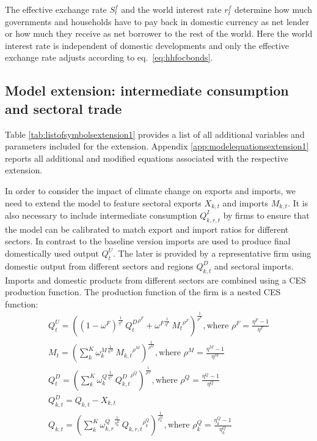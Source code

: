 \documentclass[10pt,a4paper]{article}
\begin{document}
The effective exchange rate $S^f_{t}$ and the world interest rate $r^{f}_{t}$ determine how much governments and households have to pay back in domestic currency as net lender or how much they receive as net borrower to the rest of the world. Here the world interest rate is independent of domestic developments and only the effective exchange rate adjusts according to eq.~\ref{eq:hhfocbonds}.

\subsection{Model extension: intermediate consumption and sectoral trade} 
Table \ref{tab:listofsymbolsextension1} provides a list of all additional variables and parameters included for the extension. Appendix \ref{app:modelequationsextension1} reports all additional and modified equations associated with the respective extension.

In order to consider the impact of climate change on exports and imports, we need to extend the model to feature sectoral exports $X_{k,t}$ and imports $M_{k,t}$. It is also necessary to include intermediate consumption $Q^{I}_{k,r,t}$ by firms to ensure that the model can be calibrated to match export and import ratios for different sectors. In contrast to the baseline version imports are used to produce final domestically used output $Q^U_t$. The later is provided by a representative firm using domestic output from different sectors and regions $Q^{D}_{k,t}$ and sectoral imports. Imports and domestic products from different sectors are combined using a CES production function. The production function of the firm is a nested CES function:
\begin{align}
Q^U_t = \left((1 - \omega^{F})^{\frac{1}{\eta^{F}}} \, {Q^D_t}^{\rho^F} + {\omega^{F}}^{\frac{1}{\eta^{F}}} \, {M_t}^{\rho^F}\right)^{\frac{1}{\rho^F}}, \mbox{where } \rho^{F} = \frac{\eta^F - 1}{\eta^F} \label{eq:cesfinal}\\
M_t = \left(\sum_{k}^{K}{\omega^{M}_{k}}^{\frac{1}{\eta^{M}}} \, {M_{k,t}}^{\rho^M}\right)^{\frac{1}{\rho^M}}, \mbox{where } \rho^{M} = \frac{\eta^M - 1}{\eta^M} \label{eq:imports} \\
Q^D_t = \left(\sum_{k}^{K}{\omega^{Q}_{k}}^{\frac{1}{\eta^{Q}}} \, {Q^D_{k,t}}^{\rho^Q}\right)^{\frac{1}{\rho^Q}}, \mbox{where } \rho^{Q} = \frac{\eta^Q - 1}{\eta^Q} \label{eq:domesticusedoutput} \\
Q^{D}_{k,t} = Q_{k,t} - X_{k,t} \nonumber \\ 
Q_{k,t} = \left(\sum_{k}^{K}{\omega^{Q}_{k,r}}^{\frac{1}{\eta^{Q}_{k}}} \, {Q_{k,r,t}}^{\rho^Q_{k}}\right)^{\frac{1}{\rho^Q_{k}}}, \mbox{where } \rho^{Q}_{k} = \frac{\eta^Q_{k} - 1}{\eta^Q_{k}} \nonumber 
\end{align}
\end{document}
